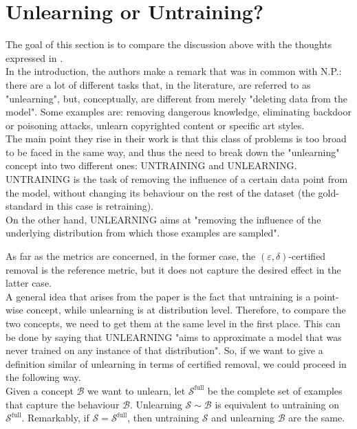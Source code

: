 \section*{Unlearning or Untraining?}
The goal of this section is to compare the discussion above with the thoughts expressed in \cite{untraining_2026}.\\
In the introduction, the authors make a remark that was in common with N.P.: there are a lot of different tasks that, in the literature, are referred to as "unlearning", but, conceptually, are different from merely "deleting data from the model". 
Some examples are: removing dangerous knowledge, eliminating backdoor or poisoning attacks, unlearn copyrighted content or specific art styles.\\
The main point they rise in their work is that this class of problems is too broad to be faced in the same way, and thus the need to break down the "unlearning" concept into two different ones: UNTRAINING and UNLEARNING.\\
UNTRAINING is the task of removing the influence of a certain data point from the model, without changing its behaviour on the rest of the dataset (the gold-standard in this case is retraining).\\
On the other hand, UNLEARNING aims at "removing the influence of the underlying distribution from which those examples are sampled".

As far as the metrics are concerned, in the former case, the $(\varepsilon,\delta)$-certified removal is the reference metric, but it does not capture the desired effect in the latter case.\\
A general idea that arises from the paper is the fact that untraining is a point-wise concept, while unlearning is at distribution level. 
Therefore, to compare the two concepts, we need to get them at the same level in the first place.
This can be done by saying that UNLEARNING "aims to approximate a model that was never trained on any instance of that distribution".
So, if we want to give a definition similar of unlearning in terms of certified removal, we could proceed in the following way.\\
Given a concept $\mathcal{B}$ we want to unlearn, let $\mathcal{S}^{\mathrm{full}}$ be the complete set of examples that capture the behaviour $\mathcal{B}$.
Unlearning $\mathcal{S}\sim\mathcal{B}$ is equivalent to untraining on $\mathcal{S}^{\mathrm{full}}$.
Remarkably, if $\mathcal{S}=\mathcal{S}^{\mathrm{full}}$, then untraining $\mathcal{S}$ and unlearning $\mathcal{B}$ are the same.

